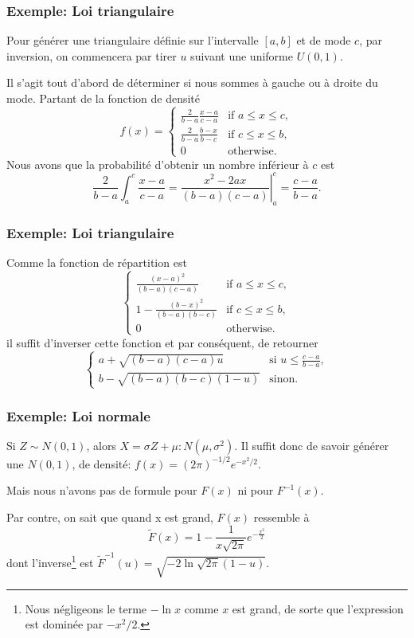 \documentclass[t,usepdftitle=false]{beamer}
\begin{document}
\begin{frame}
\frametitle{Exemple: Loi triangulaire}

Pour générer une triangulaire définie sur l'intervalle $[a,b]$ et de
mode $c$, par inversion, on commencera par tirer $u$ suivant une
uniforme $U(0,1)$.

\mbox{}

Il s'agit tout d'abord de déterminer si nous sommes à gauche ou à
droite du mode. Partant de la fonction de densité
\[
f(x) = 
\begin{cases}
\frac{2}{b-a} \frac{x-a}{c-a} & \text{if } a \leq x \leq c, \\
\frac{2}{b-a} \frac{b-x}{b-c} & \text{if } c \leq x \leq b, \\
0 & \text{otherwise}.
\end{cases}
\]
Nous avons que la probabilité d'obtenir un nombre inférieur à $c$ est
\[
\frac{2}{b-a} \int_{a}^c \frac{x-a}{c-a} =
\left. \frac{x^2-2ax}{(b-a)(c-a)} \right|_a^c = \frac{c-a}{b-a}.
\]

\end{frame}

\begin{frame}
\frametitle{Exemple: Loi triangulaire}

Comme la fonction de répartition est
\[
\begin{cases}
\frac{(x-a)^2}{(b-a)(c-a)} & \text{if } a \leq x \leq c, \\
1-\frac{(b-x)^2}{(b-a)(b-c)} & \text{if } c \leq x \leq b, \\
0 & \text{otherwise}.
\end{cases}
\]
il suffit d'inverser cette fonction et par conséquent, de retourner
\[
\begin{cases}
a+\sqrt{(b-a)(c-a)u} & \mbox{si } u \leq \frac{c-a}{b-a}, \\
b-\sqrt{(b-a)(b-c)(1-u)} & \mbox{sinon.}
\end{cases}
\]

\end{frame}

\begin{frame}
\frametitle{Exemple: Loi normale}

Si $Z \sim N (0, 1)$, alors $X =  \sigma Z + \mu : N (\mu, \sigma^2)$.
Il suffit donc de savoir générer une $N (0, 1)$, de densité: $f (x) =
(2 \pi)^{-1/2} e^{-x^2 /2}$.


\mbox{}

Mais nous n'avons pas de formule pour $F (x)$ ni pour $F^{-1}(x)$.

\mbox{}

Par contre, on sait que quand x est grand, $F(x)$ ressemble à
\[
\tilde{F}(x) =  1 - \frac{1}{x\sqrt{2\pi}}e^{-\frac{x^2}{2}}
\]
dont l'inverse\footnote{Nous négligeons le terme $-\ln x$ comme $x$ est grand, de sorte que l'expression est dominée par $-x^2/2$.} est $\tilde{F}^{-1}(u) =
\sqrt{-2 \ln \sqrt{2\pi}(1 - u)}$.

\end{frame}
\end{document}
